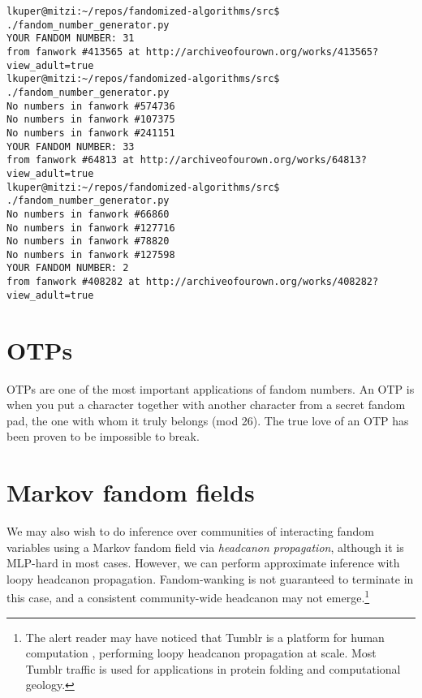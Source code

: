 \documentclass[9pt]{sigplanconf}
\begin{document}
\begin{verbatim}
lkuper@mitzi:~/repos/fandomized-algorithms/src$ ./fandom_number_generator.py 
YOUR FANDOM NUMBER: 31
from fanwork #413565 at http://archiveofourown.org/works/413565?view_adult=true
lkuper@mitzi:~/repos/fandomized-algorithms/src$ ./fandom_number_generator.py 
No numbers in fanwork #574736
No numbers in fanwork #107375
No numbers in fanwork #241151
YOUR FANDOM NUMBER: 33
from fanwork #64813 at http://archiveofourown.org/works/64813?view_adult=true
lkuper@mitzi:~/repos/fandomized-algorithms/src$ ./fandom_number_generator.py 
No numbers in fanwork #66860
No numbers in fanwork #127716
No numbers in fanwork #78820
No numbers in fanwork #127598
YOUR FANDOM NUMBER: 2
from fanwork #408282 at http://archiveofourown.org/works/408282?view_adult=true
\end{verbatim}

\section{OTPs}

OTPs are one of the most important applications of fandom numbers.  An
OTP is when you put a character together with another character from a
secret fandom pad, the one with whom it truly belongs (mod 26).  The
true love of an OTP has been proven to be impossible to break.

\section{Markov fandom fields}

We may also wish to do inference over communities of interacting
fandom variables using a Markov fandom field via \emph{headcanon
  propagation}, although it is MLP-hard in most cases.  However, we
can perform approximate inference with loopy headcanon propagation.
Fandom-wanking is not guaranteed to terminate in this case, and a
consistent community-wide headcanon may not emerge.\footnote{The alert
  reader may have noticed that Tumblr is a platform for
  human computation \cite{luisvonahn}, performing loopy
  headcanon propagation at scale. Most Tumblr traffic is used for
  applications in protein folding and computational geology.}



\end{document}
